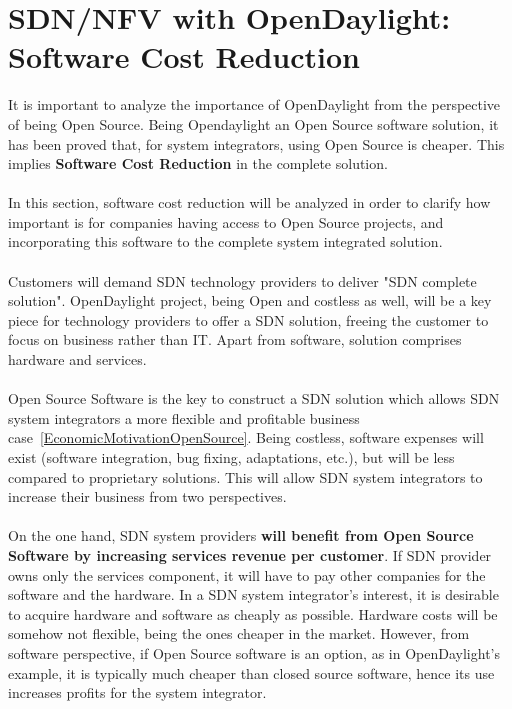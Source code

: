 \documentclass[a4paper, 12pt]{book}
\begin{document}
\section{SDN/NFV with OpenDaylight: Software Cost Reduction}
\label{sec:odlsoftwarecostreduction}

It is important to analyze the importance of OpenDaylight from the perspective of being Open Source. Being Opendaylight an Open Source software solution, it has been proved that, for system integrators, using Open Source is cheaper. This implies \textbf{Software Cost Reduction} in the complete solution.\\
\\
In this section, software cost reduction will be analyzed in order to clarify how important is for companies having access to Open Source projects, and incorporating this software to the complete system integrated solution.\\
\\
Customers will demand SDN technology providers to deliver "SDN complete solution". OpenDaylight project, being Open and costless as well, will be a key piece for technology providers to offer a SDN solution, freeing the customer to focus on business rather than IT. Apart from software, solution comprises hardware and services.\\
\\
Open Source Software is the key to construct a SDN solution which allows SDN system integrators a more flexible and profitable business case~\ref{EconomicMotivationOpenSource}. Being costless, software expenses will exist (software integration, bug fixing, adaptations, etc.), but will be less compared to proprietary solutions. This will allow SDN system integrators to increase their business from two perspectives.\\
\\
On the one hand, SDN system providers \textbf{will benefit from Open Source Software by increasing services revenue per customer}. If SDN provider owns only the services component, it will have to pay other companies for the software and the hardware. In a SDN system integrator's interest, it is desirable to acquire hardware and software as cheaply as possible. Hardware costs will be somehow not flexible, being the ones cheaper in the market. However, from software perspective, if Open Source software is an option, as in OpenDaylight's example, it is typically much cheaper than closed source software, hence its use increases profits for the system integrator.
\end{document}
